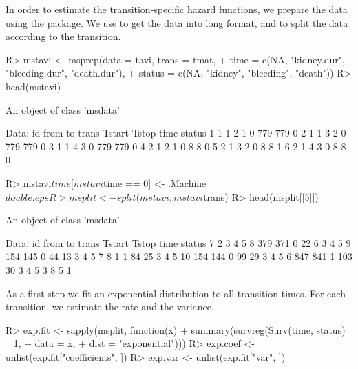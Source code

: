 In order to estimate the transition-specific hazard functions, we prepare the data using the  package. We use  to get the data into long format, and  to split the data according to the transition. 
\begin{Schunk}
\begin{Sinput}
R>   mstavi <- msprep(data = tavi, trans = tmat, 
+                  time = c(NA, "kidney.dur", "bleeding.dur", "death.dur"),
+                  status = c(NA, "kidney", "bleeding",  "death"))
R>   head(mstavi)
\end{Sinput}
\begin{Soutput}
An object of class 'msdata'

Data:
  id from to trans Tstart Tstop time status
1  1    1  2     1      0   779  779      0
2  1    1  3     2      0   779  779      0
3  1    1  4     3      0   779  779      0
4  2    1  2     1      0     8    8      0
5  2    1  3     2      0     8    8      1
6  2    1  4     3      0     8    8      0
\end{Soutput}
\begin{Sinput}
R>   mstavi$time[mstavi$time == 0] <- .Machine$double.eps
R>   msplit <- split(mstavi, mstavi$trans)
R>   head(msplit[[5]])
\end{Sinput}
\begin{Soutput}
An object of class 'msdata'

Data:
    id from to trans Tstart Tstop time status
7    2    3  4     5      8   379  371      0
22   6    3  4     5      9   154  145      0
44  13    3  4     5      7     8    1      1
84  25    3  4     5     10   154  144      0
99  29    3  4     5      6   847  841      1
103 30    3  4     5      3     8    5      1
\end{Soutput}
\end{Schunk}

As a first step we fit an exponential distribution to all transition times. For each transition, we estimate the rate and the variance. 
\begin{Schunk}
\begin{Sinput}
R>   exp.fit <- sapply(msplit, function(x) 
+     summary(survreg(Surv(time, status) ~ 1, 
+                     data = x, 
+                     dist = "exponential")))
R>   exp.coef <- unlist(exp.fit["coefficients", ])
R>   exp.var <- unlist(exp.fit["var", ])
\end{Sinput}
\end{Schunk}

